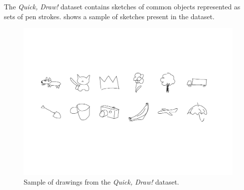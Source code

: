 \medskip

The \emph{Quick, Draw!} \citep{quickdraw} dataset contains sketches of common objects represented as sets of pen strokes.  shows a sample of sketches present in the dataset.

\begin{figure}[ht]
    \centering
    \includegraphics[width=\textwidth,trim=40 150 40 125,clip]{figures/quickdraw.pdf}
    \caption[Sample of drawings from the \emph{Quick, Draw!} dataset]{Sample of drawings from the \emph{Quick, Draw!} dataset.}
    \label{fig:quickdraw_example}
\end{figure}
